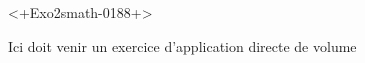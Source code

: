 
\begin{exercice}\label{exo2smath-0188}

<+Exo2smath-0188+>

{
    \Huge
Ici doit venir un exercice d'application directe de volume
}

\end{exercice}
